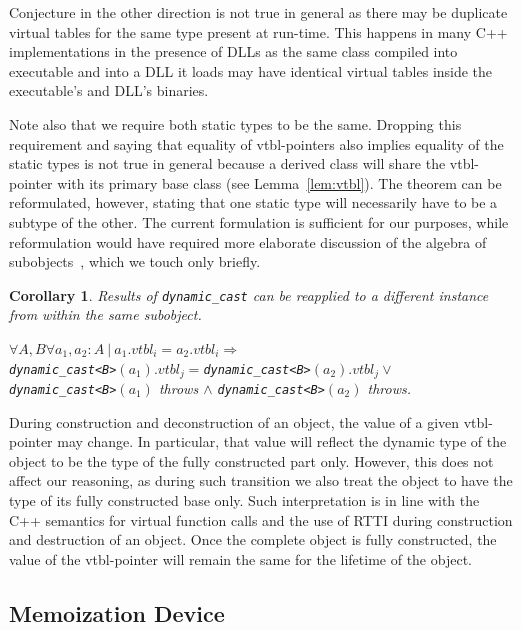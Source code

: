 \documentclass[preprint]{sigplanconf}
\makeatletter
\DeclareRobustCommand{\code}[1]{{\lstinline[breaklines=false,escapechar=@]{#1}}}
\newtheorem{corollary}{Corollary}
\makeatother
\begin{document}
\noindent
Conjecture in the other direction is not true in general as there may be 
duplicate virtual tables for the same type present at run-time. This happens in 
many C++ implementations in the presence of DLLs as the same class compiled into 
executable and into a DLL it loads may have identical virtual tables inside the 
executable's and DLL's binaries.

Note also that we require both static types to be the same. Dropping this 
requirement and saying that equality of vtbl-pointers also implies equality of 
the static types is not true in general because a derived class will share the 
vtbl-pointer with its primary base class (see Lemma~\ref{lem:vtbl}). The theorem 
can be reformulated, however, stating that one static type will necessarily have 
to be a subtype of the other. The current formulation is sufficient for our 
purposes, while reformulation would have required more elaborate discussion of 
the algebra of subobjects~\cite{RDL11}, which we touch only briefly.

\begin{corollary}
Results of \code{dynamic_cast} can be reapplied to a different instance from 
within the same subobject. 

$\forall A,B \forall a_1, a_2 : A\ |\ a_1.\textit{vtbl}_i = a_2.\textit{vtbl}_i \Rightarrow$ \\
\code{dynamic_cast<B>}$(a_1).\textit{vtbl}_j = $\code{dynamic_cast<B>}$(a_2).\textit{vtbl}_j \vee$ \\
\code{dynamic_cast<B>}$(a_1)$ throws $\wedge$ \code{dynamic_cast<B>}$(a_2)$ throws.
\label{crl:vtbl}
\end{corollary}

\noindent
During construction and deconstruction of 
an object, the value of a given vtbl-pointer may change. In particular, 
that value will reflect the dynamic type of the object to be the type of the 
fully constructed part only. However, this does not affect our reasoning, as during 
such transition we also treat the object to have the type of its fully 
constructed base only. Such interpretation is in line with the C++ semantics for 
virtual function calls and the use of RTTI during construction and destruction of an 
object. Once the complete object is fully constructed, the value of the 
vtbl-pointer will remain the same for the lifetime of the object.

\subsection{Memoization Device}
\label{sec:memdev}
\end{document}
